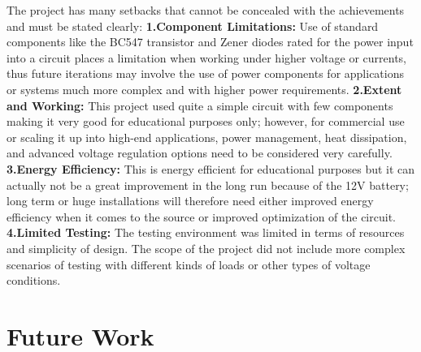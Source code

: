 \begin{flushleft}
The project has many setbacks that cannot be concealed with the achievements and must be stated clearly:
\newline\textbf{1.Component Limitations:} Use of standard components like the BC547 transistor and Zener diodes rated for the power input into a circuit places a limitation when working under higher voltage or currents, thus future iterations may involve the use of power components for applications or systems much more complex and with higher power requirements.
\newline\textbf{2.Extent and Working:} This project used quite a simple circuit with few components making it very good for educational purposes only; however, for commercial use or scaling it up into high-end applications, power management, heat dissipation, and advanced voltage regulation options need to be considered very carefully.
\newline\textbf{3.Energy Efficiency:} This is energy efficient for educational purposes but it can actually not be a great improvement in the long run because of the 12V battery; long term or huge installations will therefore need either improved energy efficiency when it comes to the source or improved optimization of the circuit.
\newline\textbf{4.Limited Testing:} The testing environment was limited in terms of resources and simplicity of design. The scope of the project did not include more complex scenarios of testing with different kinds of loads or other types of voltage conditions.\cite{6}

\section{Future Work}


\end{flushleft}
